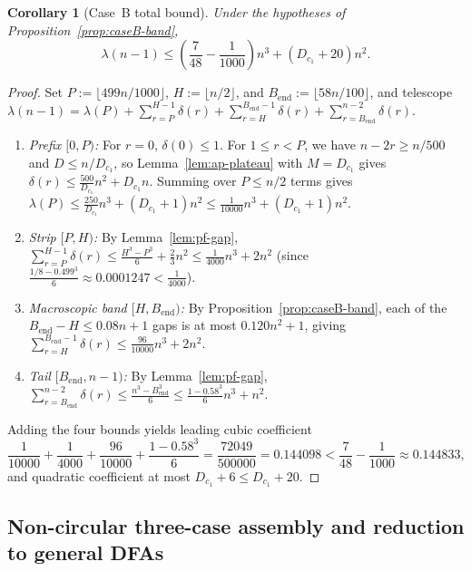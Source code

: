 \documentclass[11pt]{article}
\newtheorem{corollary}[theorem]{Corollary}
\theoremstyle{definition}
\theoremstyle{remark}
\begin{document}
\begin{corollary}[Case~B total bound]\label{cor:caseB-total}
Under the hypotheses of Proposition~\ref{prop:caseB-band},
\[
  \lambda(n - 1) \le \left(\frac{7}{48} - \frac{1}{1000}\right) n^3 + (D_{c_1} + 20) n^2.
\]
\end{corollary}

\begin{proof}
Set $P := \lfloor 499 n / 1000 \rfloor$, $H := \lfloor n / 2 \rfloor$, and $B_{\mathrm{end}} := \lfloor 58 n / 100 \rfloor$, and telescope $\lambda(n - 1) = \lambda(P) + \sum_{r=P}^{H-1} \delta(r) + \sum_{r=H}^{B_{\mathrm{end}}-1} \delta(r) + \sum_{r=B_{\mathrm{end}}}^{n-2} \delta(r)$.
\begin{enumerate}[label=(\arabic*), leftmargin=2em]
  \item \emph{Prefix $[0, P)$:} For $r = 0$, $\delta(0) \le 1$. For $1 \le r < P$, we have $n - 2r \ge n / 500$ and $D \le n / D_{c_1}$, so Lemma~\ref{lem:ap-plateau} with $M = D_{c_1}$ gives $\delta(r) \le \frac{500}{D_{c_1}} n^2 + D_{c_1} n$. Summing over $P \le n / 2$ terms gives $\lambda(P) \le \frac{250}{D_{c_1}} n^3 + (D_{c_1} + 1) n^2 \le \frac{1}{10000} n^3 + (D_{c_1} + 1) n^2$.
  \item \emph{Strip $[P, H)$:} By Lemma~\ref{lem:pf-gap}, $\sum_{r=P}^{H-1} \delta(r) \le \frac{H^3 - P^3}{6} + \frac{2}{3} n^2 \le \frac{1}{4000} n^3 + 2 n^2$ (since $\frac{1/8 - 0.499^3}{6} \approx 0.0001247 < \frac{1}{4000}$).
  \item \emph{Macroscopic band $[H, B_{\mathrm{end}})$:} By Proposition~\ref{prop:caseB-band}, each of the $B_{\mathrm{end}} - H \le 0.08 n + 1$ gaps is at most $0.120 n^2 + 1$, giving $\sum_{r=H}^{B_{\mathrm{end}}-1} \delta(r) \le \frac{96}{10000} n^3 + 2 n^2$.
  \item \emph{Tail $[B_{\mathrm{end}}, n - 1)$:} By Lemma~\ref{lem:pf-gap}, $\sum_{r=B_{\mathrm{end}}}^{n-2} \delta(r) \le \frac{n^3 - B_{\mathrm{end}}^3}{6} \le \frac{1 - 0.58^3}{6} n^3 + n^2$.
\end{enumerate}
Adding the four bounds yields leading cubic coefficient
\[
  \frac{1}{10000} + \frac{1}{4000} + \frac{96}{10000} + \frac{1 - 0.58^3}{6}
  = \frac{72049}{500000} = 0.144098 < \frac{7}{48} - \frac{1}{1000} \approx 0.144833,
\]
and quadratic coefficient at most $D_{c_1} + 6 \le D_{c_1} + 20$.
\end{proof}

\subsection{Non-circular three-case assembly and reduction to general DFAs}\label{sec:assembly}
\end{document}
